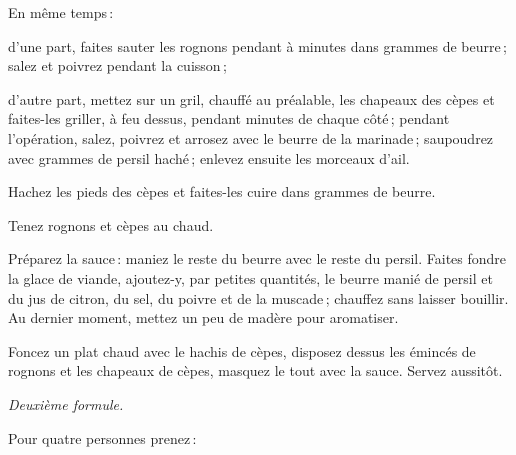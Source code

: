 En même temps :

d'une part, faites sauter les rognons pendant {\mmm} à {\mmm} minutes
dans {\mmm} grammes de beurre ; salez et poivrez pendant la cuisson ;

d'autre part, mettez sur un gril, chauffé au préalable, les chapeaux des cèpes
et faites-les griller, à feu dessus, pendant {\mmm} minutes de chaque
côté ; pendant l'opération, salez, poivrez et arrosez avec le beurre de la
marinade ; saupoudrez avec {\mmm} grammes de persil haché ; enlevez
ensuite les morceaux d'ail.

Hachez les pieds des cèpes et faites-les cuire dans {\mmm} grammes de
beurre.

Tenez rognons et cèpes au chaud.

Préparez la sauce : maniez le reste du beurre avec le reste du persil. Faites
fondre la glace de viande, ajoutez-y, par petites quantités, le beurre manié de
persil et du jus de citron, du sel, du poivre et de la muscade ; chauffez sans
laisser bouillir. Au dernier moment, mettez un peu de madère pour aromatiser.

Foncez un plat chaud avec le hachis de cèpes, disposez dessus les émincés de
rognons et les chapeaux de cèpes, masquez le tout avec la sauce. Servez aussitôt.

\medskip

\begin{center}
\textit{Deuxième formule.}
\end{center}

\medskip

Pour quatre personnes prenez :

\medskip

